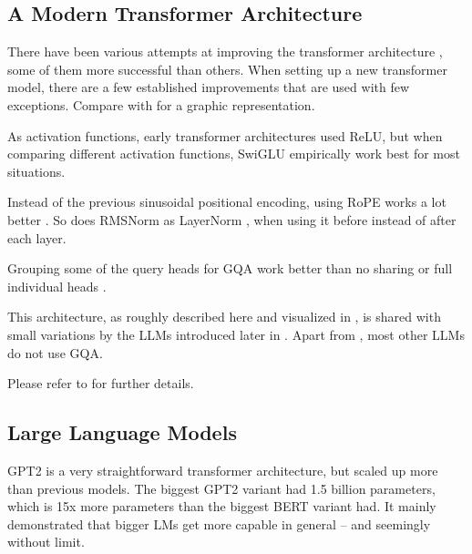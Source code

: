
\subsection{A Modern Transformer Architecture}\label{sub:modern}

There have been various attempts at improving the transformer architecture \cite{shazeer_glu_2020, su_roformer_2022, ainslie_gqa_2023, bolya_hydra_2022, sukhbaatar_adaptive_2019, lu_understanding_2019, ye_understanding_2023, wu_memorizing_2022}, some of them more successful than others.
When setting up a new transformer model, there are a few established improvements that are used with few exceptions.
Compare with  for a graphic representation.

As activation functions, early transformer architectures used \gls{ReLU}, but when comparing different activation functions, \gls{SwiGLU} %
empirically work best for most situations.

Instead of the previous sinusoidal positional encoding, using \gls{RoPE} works a lot better
. So does RMSNorm as LayerNorm \cite{ba_layer_2016}, when using it before instead of after each layer.

Grouping some of the query heads for \gls{GQA} 
work better than no sharing or full individual heads \cite{bolya_hydra_2022}.



This architecture, as roughly described here and visualized in , is shared with small variations by the \glspl{LLM} introduced later in .
Apart from , most other \glspl{LLM} do not use \gls{GQA}.

Please refer to \cite{naveed_comprehensive_2023} for further details.

\subsection{Large Language Models}\label{sub:llm}

\gls{GPT2} \cite{radford_language_2019} is a very straightforward transformer architecture, but scaled up more than previous models.
The biggest \gls{GPT2} variant had 1.5 billion parameters, which is 15x more parameters than the biggest \gls{BERT} variant had.
It mainly demonstrated that bigger \glspl{LM} get more capable in general -- and seemingly without limit.

